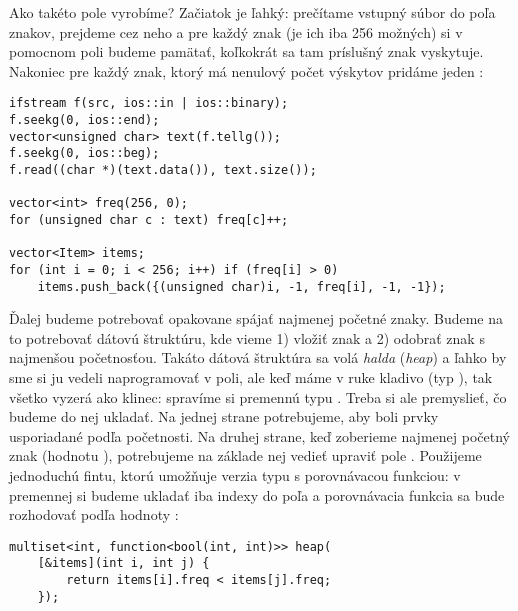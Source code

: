 Ako takéto pole vyrobíme? Začiatok je ľahký: prečítame vstupný súbor do poľa znakov,
prejdeme cez neho a pre každý znak (je ich iba 256 možných) si v pomocnom poli 
budeme pamätať, koľkokrát sa tam príslušný znak vyskytuje. Nakoniec pre každý znak,
ktorý má nenulový počet výskytov pridáme jeden :

\begin{lstlisting}
ifstream f(src, ios::in | ios::binary);
f.seekg(0, ios::end);
vector<unsigned char> text(f.tellg());
f.seekg(0, ios::beg);
f.read((char *)(text.data()), text.size());

vector<int> freq(256, 0);
for (unsigned char c : text) freq[c]++;

vector<Item> items;
for (int i = 0; i < 256; i++) if (freq[i] > 0) 
    items.push_back({(unsigned char)i, -1, freq[i], -1, -1});
\end{lstlisting}


Ďalej budeme potrebovať opakovane spájať najmenej početné znaky. Budeme na to potrebovať
dátovú štruktúru, kde vieme 1) vložiť znak a 2) odobrať znak s najmenšou početnosťou. 
Takáto dátová štruktúra sa volá {\em halda} ({\em heap}) a ľahko by sme si ju 
vedeli naprogramovať v poli, ale keď máme v ruke kladivo (typ ), tak všetko
vyzerá ako klinec: spravíme si premennú   typu . 
Treba si ale premyslieť, čo budeme do nej
ukladať. Na jednej strane potrebujeme, aby boli prvky usporiadané podľa početnosti. 
Na druhej strane, keď zoberieme najmenej početný znak (hodnotu ),
potrebujeme na základe nej vedieť upraviť pole . Použijeme jednoduchú fintu,
ktorú umožňuje verzia typu  s porovnávacou funkciou: v premennej 
si budeme ukladať iba indexy do poľa  a porovnávacia funkcia 
sa bude rozhodovať podľa hodnoty :

\begin{lstlisting}
multiset<int, function<bool(int, int)>> heap(
    [&items](int i, int j) { 
        return items[i].freq < items[j].freq; 
    });
\end{lstlisting}

